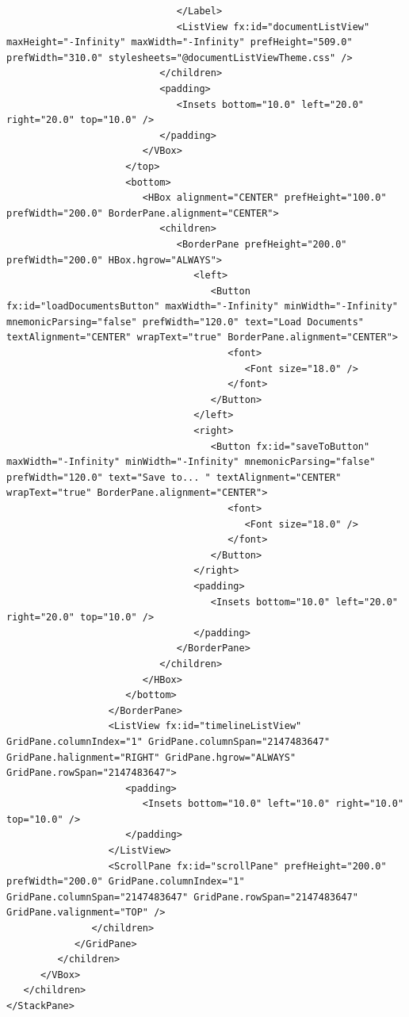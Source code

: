 \begin{lstlisting}
                              </Label>
                              <ListView fx:id="documentListView" maxHeight="-Infinity" maxWidth="-Infinity" prefHeight="509.0" prefWidth="310.0" stylesheets="@documentListViewTheme.css" />
                           </children>
                           <padding>
                              <Insets bottom="10.0" left="20.0" right="20.0" top="10.0" />
                           </padding>
                        </VBox>
                     </top>
                     <bottom>
                        <HBox alignment="CENTER" prefHeight="100.0" prefWidth="200.0" BorderPane.alignment="CENTER">
                           <children>
                              <BorderPane prefHeight="200.0" prefWidth="200.0" HBox.hgrow="ALWAYS">
                                 <left>
                                    <Button fx:id="loadDocumentsButton" maxWidth="-Infinity" minWidth="-Infinity" mnemonicParsing="false" prefWidth="120.0" text="Load Documents" textAlignment="CENTER" wrapText="true" BorderPane.alignment="CENTER">
                                       <font>
                                          <Font size="18.0" />
                                       </font>
                                    </Button>
                                 </left>
                                 <right>
                                    <Button fx:id="saveToButton" maxWidth="-Infinity" minWidth="-Infinity" mnemonicParsing="false" prefWidth="120.0" text="Save to... " textAlignment="CENTER" wrapText="true" BorderPane.alignment="CENTER">
                                       <font>
                                          <Font size="18.0" />
                                       </font>
                                    </Button>
                                 </right>
                                 <padding>
                                    <Insets bottom="10.0" left="20.0" right="20.0" top="10.0" />
                                 </padding>
                              </BorderPane>
                           </children>
                        </HBox>
                     </bottom>
                  </BorderPane>
                  <ListView fx:id="timelineListView" GridPane.columnIndex="1" GridPane.columnSpan="2147483647" GridPane.halignment="RIGHT" GridPane.hgrow="ALWAYS" GridPane.rowSpan="2147483647">
                     <padding>
                        <Insets bottom="10.0" left="10.0" right="10.0" top="10.0" />
                     </padding>
                  </ListView>
                  <ScrollPane fx:id="scrollPane" prefHeight="200.0" prefWidth="200.0" GridPane.columnIndex="1" GridPane.columnSpan="2147483647" GridPane.rowSpan="2147483647" GridPane.valignment="TOP" />
               </children>
            </GridPane>
         </children>
      </VBox>
   </children>
</StackPane>
\end{lstlisting}
